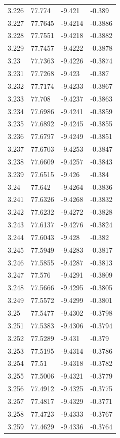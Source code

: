 \begin{tabular}{llll}
3.226 & 77.774 & -9.421 & -0.389 \\
3.227 & 77.7645 & -9.4214 & -0.3886 \\
3.228 & 77.7551 & -9.4218 & -0.3882 \\
3.229 & 77.7457 & -9.4222 & -0.3878 \\
3.23 & 77.7363 & -9.4226 & -0.3874 \\
3.231 & 77.7268 & -9.423 & -0.387 \\
3.232 & 77.7174 & -9.4233 & -0.3867 \\
3.233 & 77.708 & -9.4237 & -0.3863 \\
3.234 & 77.6986 & -9.4241 & -0.3859 \\
3.235 & 77.6892 & -9.4245 & -0.3855 \\
3.236 & 77.6797 & -9.4249 & -0.3851 \\
3.237 & 77.6703 & -9.4253 & -0.3847 \\
3.238 & 77.6609 & -9.4257 & -0.3843 \\
3.239 & 77.6515 & -9.426 & -0.384 \\
3.24 & 77.642 & -9.4264 & -0.3836 \\
3.241 & 77.6326 & -9.4268 & -0.3832 \\
3.242 & 77.6232 & -9.4272 & -0.3828 \\
3.243 & 77.6137 & -9.4276 & -0.3824 \\
3.244 & 77.6043 & -9.428 & -0.382 \\
3.245 & 77.5949 & -9.4283 & -0.3817 \\
3.246 & 77.5855 & -9.4287 & -0.3813 \\
3.247 & 77.576 & -9.4291 & -0.3809 \\
3.248 & 77.5666 & -9.4295 & -0.3805 \\
3.249 & 77.5572 & -9.4299 & -0.3801 \\
3.25 & 77.5477 & -9.4302 & -0.3798 \\
3.251 & 77.5383 & -9.4306 & -0.3794 \\
3.252 & 77.5289 & -9.431 & -0.379 \\
3.253 & 77.5195 & -9.4314 & -0.3786 \\
3.254 & 77.51 & -9.4318 & -0.3782 \\
3.255 & 77.5006 & -9.4321 & -0.3779 \\
3.256 & 77.4912 & -9.4325 & -0.3775 \\
3.257 & 77.4817 & -9.4329 & -0.3771 \\
3.258 & 77.4723 & -9.4333 & -0.3767 \\
3.259 & 77.4629 & -9.4336 & -0.3764 \\

\end{tabular}
